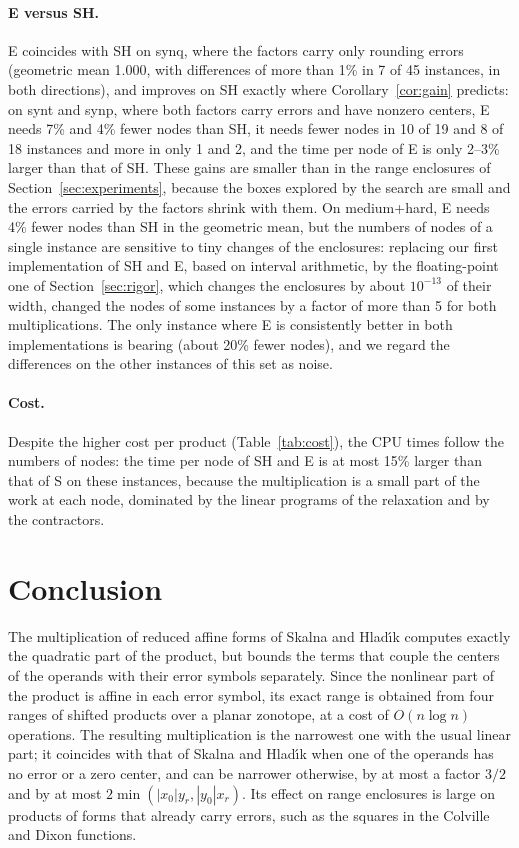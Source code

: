 \documentclass[10pt]{article}
\theoremstyle{definition}
\begin{document}
\paragraph{E versus SH.} E coincides with SH on synq, where the factors carry only rounding errors (geometric mean 1.000, with differences of more than 1\% in 7 of 45 instances, in both directions), and improves on SH exactly where Corollary~\ref{cor:gain} predicts: on synt and synp, where both factors carry errors and have nonzero centers, E needs 7\% and 4\% fewer nodes than SH, it needs fewer nodes in 10 of 19 and 8 of 18 instances and more in only 1 and 2, and the time per node of E is only 2--3\% larger than that of SH. These gains are smaller than in the range enclosures of Section~\ref{sec:experiments}, because the boxes explored by the search are small and the errors carried by the factors shrink with them. On medium+hard, E needs 4\% fewer nodes than SH in the geometric mean, but the numbers of nodes of a single instance are sensitive to tiny changes of the enclosures: replacing our first implementation of SH and E, based on interval arithmetic, by the floating-point one of Section~\ref{sec:rigor}, which changes the enclosures by about $10^{-13}$ of their width, changed the nodes of some instances by a factor of more than 5 for both multiplications. The only instance where E is consistently better in both implementations is bearing (about 20\% fewer nodes), and we regard the differences on the other instances of this set as noise.

\paragraph{Cost.} Despite the higher cost per product (Table~\ref{tab:cost}), the CPU times follow the numbers of nodes: the time per node of SH and E is at most 15\% larger than that of S on these instances, because the multiplication is a small part of the work at each node, dominated by the linear programs of the relaxation and by the contractors.


\section{Conclusion}

The multiplication of reduced affine forms of Skalna and Hlad\'{\i}k computes exactly the quadratic part of the product, but bounds the terms that couple the centers of the operands with their error symbols separately. Since the nonlinear part of the product is affine in each error symbol, its exact range is obtained from four ranges of shifted products over a planar zonotope, at a cost of $O(n\log n)$ operations. The resulting multiplication is the narrowest one with the usual linear part; it coincides with that of Skalna and Hlad\'{\i}k when one of the operands has no error or a zero center, and can be narrower otherwise, by at most a factor $3/2$ and by at most $2\min(|x_0|y_r,|y_0|x_r)$. Its effect on range enclosures is large on products of forms that already carry errors, such as the squares in the Colville and Dixon functions.
\end{document}
